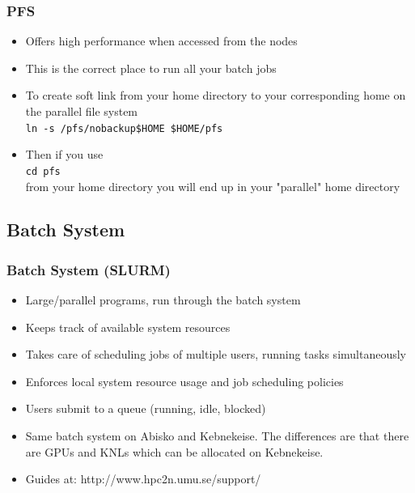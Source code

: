 \begin{frame}
    \frametitle{PFS}

	\begin{itemize}
		\item	Offers high performance when accessed from the nodes
		\item	This is the correct place to run all your batch jobs
		\item	To create soft link from your home directory to your
				corresponding home on the parallel file system\\
				\texttt{ln~-s~/pfs/nobackup\$HOME~\$HOME/pfs}
		\item	Then if you use\\
				\texttt{cd pfs}\\
				from your home directory
				you will end up in your "parallel" home directory
				
	\end{itemize}
	
\end{frame}


\subsection{Batch System}

\begin{frame}
	\frametitle{Batch System (SLURM)}

	\begin{itemize}
		\item	Large/parallel programs, run through the batch system
		\item	Keeps track of available system resources
		\item	Takes care of scheduling jobs of multiple users,
				running tasks simultaneously
		\item	Enforces local system resource usage and job scheduling policies
		\item	Users submit to a queue (running, idle, blocked)
		\item	Same batch system on  Abisko and Kebnekeise. The differences are that
			there are GPUs and KNLs which can be allocated on Kebnekeise.
		\item   Guides at: http://www.hpc2n.umu.se/support/
	\end{itemize}

\end{frame}


